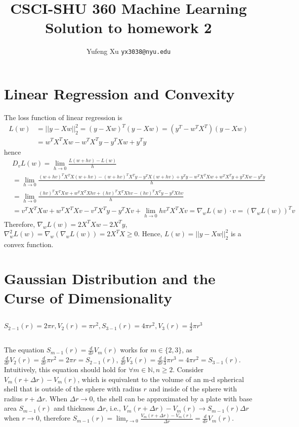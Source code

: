 \documentclass{article}
\title{CSCI-SHU 360 Machine Learning\\
    Solution to homework 2}
\author{Yufeng Xu \texttt{yx3038@nyu.edu}}
\begin{document}
    \maketitle

    \section{Linear Regression and Convexity}\label{1}
        The loss function of linear regression is 
        \begin{align*}
            L(w)&=||y-Xw||_2^2=(y-Xw)^T(y-Xw)=(y^T-w^TX^T)(y-Xw)\\
            &=w^TX^TXw-w^TX^Ty-y^TXw+y^Ty
        \end{align*}
        hence 
        \begin{align*}
            &D_v L(w)=\lim_{h\to 0}\frac{L(w+hv)-L(w)}{h}\\
            &=\lim_{h\to 0}\frac{(w+hv)^TX^TX(w+hv)-(w+hv)^TX^Ty-y^TX(w+hv)+y^Ty-w^TX^TXw+w^TX^Ty+y^TXw-y^Ty}{h}\\
            &=\lim_{h\to 0}\frac{(hv)^TX^TXw+w^TX^TXhv+(hv)^TX^TXhv-(hv)^TX^Ty-y^TXhv}{h}\\
            &=v^TX^TXw+w^TX^TXv-v^TX^Ty-y^TXv+\lim_{h\to 0}hv^TX^TXv=\nabla_w L(w)\cdot v=(\nabla_w L(w))^Tv
        \end{align*}
        Therefore, $\nabla_w L(w)=2X^TXw-2X^Ty$, $\nabla_w^2 L(w)=\nabla_w(\nabla_w L(w))=2X^TX\geq 0$. Hence, $L(w)=||y-Xw||_2^2$ is a convex function. 
        
    \section{Gaussian Distribution and the Curse of Dimensionality}

        \subsection{}
        $S_{2-1}(r)=2\pi r, V_{2}(r)=\pi r^2, S_{3-1}(r)=4\pi r^2, V_{3}(r)=\frac{4}{3}\pi r^3$
        
        \subsection{}\label{2.2}
        The equation $S_{m-1}(r)=\frac{d}{dr}V_{m}(r)$ works for $m\in \{2, 3\}$, 
        as $\frac{d}{dr}V_2(r)=\frac{d}{dr}\pi r^2=2\pi r=S_{2-1}(r)$,
        $\frac{d}{dr}V_3(r)=\frac{d}{dr}\frac{4}{3}\pi r^3=4\pi r^2=S_{3-1}(r)$.\\
        Intuitively, this equation should hold for $\forall m\in \mathbb{N}, n\geq 2$. 
        Consider $V_m(r+\Delta r)-V_m(r)$, which is equivalent to the volume of an m-d spherical shell 
        that is outside of the sphere with radius $r$ and inside of the sphere with radius $r+\Delta r$.
        When $\Delta r\to 0$, the shell can be approximated by a plate with base area $S_{m-1}(r)$ and thickness $\Delta r$,
        i.e., $V_m(r+\Delta r)-V_m(r)\to S_{m-1}(r)\Delta r$ when $r\to 0$, therefore $S_{m-1}(r)=\lim_{r\to 0}\frac{V_m(r+\Delta r)-V_m(r)}{\Delta r}=\frac{d}{dr}V_m(r)$.
\end{document}
